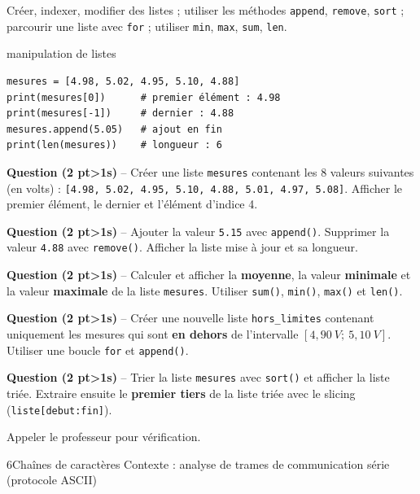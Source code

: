 \documentclass[11pt,a4paper]{article}
\newcommand{\cadreblanc}[1]{%
  \medskip\framebox[\linewidth][c]{\rule{0mm}{#1mm}}\par\medskip}
\newcounter{qnum}
\newcommand{\resetq}{\setcounter{qnum}{0}}
\newcommand{\q}[2]{%
  \stepcounter{qnum}%
  \noindent\textbf{Question \theqnum{} \normalfont(#2 pt\ifnum#2>1s\fi)} -- #1\par\smallskip}
\begin{document}
\begin{objectifbox}{}
  Créer, indexer, modifier des listes ; utiliser les méthodes \texttt{append}, \texttt{remove}, \texttt{sort} ; parcourir une liste avec \texttt{for} ; utiliser \texttt{min}, \texttt{max}, \texttt{sum}, \texttt{len}.
\end{objectifbox}

\begin{codebox}{manipulation de listes}
\begin{lstlisting}
mesures = [4.98, 5.02, 4.95, 5.10, 4.88]
print(mesures[0])      # premier élément : 4.98
print(mesures[-1])     # dernier : 4.88
mesures.append(5.05)   # ajout en fin
print(len(mesures))    # longueur : 6
\end{lstlisting}
\end{codebox}

\q{Créer une liste \texttt{mesures} contenant les 8 valeurs suivantes (en volts) :
\texttt{[4.98, 5.02, 4.95, 5.10, 4.88, 5.01, 4.97, 5.08]}.
Afficher le premier élément, le dernier et l'élément d'indice 4.}{2}
\cadreblanc{18}

\q{Ajouter la valeur \texttt{5.15} avec \texttt{append()}. Supprimer la valeur \texttt{4.88} avec \texttt{remove()}. Afficher la liste mise à jour et sa longueur.}{2}
\cadreblanc{20}

\q{Calculer et afficher la \textbf{moyenne}, la valeur \textbf{minimale} et la valeur \textbf{maximale} de la liste \texttt{mesures}. Utiliser \texttt{sum()}, \texttt{min()}, \texttt{max()} et \texttt{len()}.}{2}
\cadreblanc{20}

\q{Créer une nouvelle liste \texttt{hors\_limites} contenant uniquement les mesures qui sont \textbf{en dehors} de l'intervalle $[4{,}90\ V ;\ 5{,}10\ V]$. Utiliser une boucle \texttt{for} et \texttt{append()}.}{2}
\cadreblanc{24}

\q{Trier la liste \texttt{mesures} avec \texttt{sort()} et afficher la liste triée. Extraire ensuite le \textbf{premier tiers} de la liste triée avec le slicing (\texttt{liste[debut:fin]}).}{2}
\cadreblanc{22}

\begin{appelbox}
  \centering Appeler le professeur pour vérification.
\end{appelbox}

\clearpage
\resetq
\begin{tptitre}{6}{Chaînes de caractères}
  Contexte : analyse de trames de communication série (protocole ASCII)
\end{tptitre}
\end{document}
